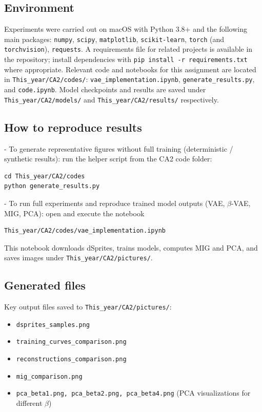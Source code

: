 \documentclass[conference]{IEEEtran}
\begin{document}
\subsection{Environment}
Experiments were carried out on macOS with Python 3.8+ and the following main packages: \texttt{numpy}, \texttt{scipy}, \texttt{matplotlib}, \texttt{scikit-learn}, \texttt{torch} (and \texttt{torchvision}), \texttt{requests}. A requirements file for related projects is available in the repository; install dependencies with \texttt{pip install -r requirements.txt} where appropriate. Relevant code and notebooks for this assignment are located in \texttt{This_year/CA2/codes/}: \texttt{vae_implementation.ipynb}, \texttt{generate_results.py}, and \texttt{code.ipynb}. Model checkpoints and results are saved under \texttt{This_year/CA2/models/} and \texttt{This_year/CA2/results/} respectively.

\subsection{How to reproduce results}
- To generate representative figures without full training (deterministic / synthetic results): run the helper script from the CA2 code folder:
\begin{verbatim}
cd This_year/CA2/codes
python generate_results.py
\end{verbatim}
- To run full experiments and reproduce trained model outputs (VAE, $\beta$-VAE, MIG, PCA): open and execute the notebook
\begin{verbatim}
This_year/CA2/codes/vae_implementation.ipynb
\end{verbatim}
This notebook downloads dSprites, trains models, computes MIG and PCA, and saves images under \texttt{This_year/CA2/pictures/}.

\subsection{Generated files}
Key output files saved to \texttt{This_year/CA2/pictures/}:
\begin{itemize}
\item \texttt{dsprites_samples.png}
\item \texttt{training_curves_comparison.png}
\item \texttt{reconstructions_comparison.png}
\item \texttt{mig_comparison.png}
\item \texttt{pca_beta1.png, pca_beta2.png, pca_beta4.png} (PCA visualizations for different $\beta$)
\end{itemize}
\end{document}
